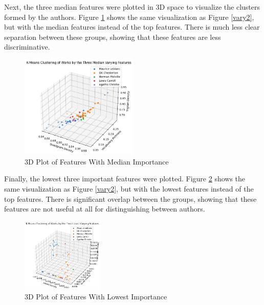 \documentclass[journal]{IEEEtran} %
\begin{document}
Next, the three median features were plotted in 3D space to visualize the clusters formed by the authors. Figure \ref{vary3} shows the same visualization as Figure \ref{vary2}, but with the median features instead of the top features. There is much less clear separation between these groups, showing that these features are less discriminative.

\begin{figure}
    \caption{3D Plot of Features With Median Importance}
    \begin{center}
    \centerline{\includegraphics[width=0.5\textwidth]{./vary3.png}}
    \end{center}
    \centering
    \label{vary3}
\end{figure}

Finally, the lowest three important features were plotted. Figure \ref{vary4} shows the same visualization as Figure \ref{vary2}, but with the lowest features instead of the top features. There is significant overlap between the groups, showing that these features are not useful at all for distinguishing between authors.

\begin{figure}[h!]
    \caption{3D Plot of Features With Lowest Importance}
    \begin{center}
    \centerline{\includegraphics[width=0.35\textwidth]{./vary4.png}}
    \end{center}
    \centering
    \label{vary4}
\end{figure}
\end{document}
